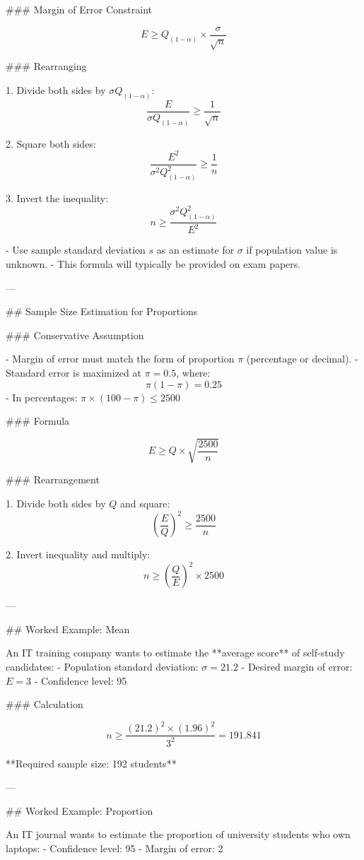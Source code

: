 ### Margin of Error Constraint

\[
E \geq Q_{(1-\alpha)} \times \frac{\sigma}{\sqrt{n}}
\]

### Rearranging

1. Divide both sides by \( \sigma Q_{(1-\alpha)} \):
\[
\frac{E}{\sigma Q_{(1-\alpha)}} \geq \frac{1}{\sqrt{n}}
\]

2. Square both sides:
\[
\frac{E^2}{\sigma^2 Q_{(1-\alpha)}^2} \geq \frac{1}{n}
\]

3. Invert the inequality:
\[
n \geq \frac{\sigma^2 Q_{(1-\alpha)}^2}{E^2}
\]

- Use sample standard deviation \( s \) as an estimate for \( \sigma \) if population value is unknown.
- This formula will typically be provided on exam papers.

---

## Sample Size Estimation for Proportions

### Conservative Assumption

- Margin of error must match the form of proportion \( \pi \) (percentage or decimal).
- Standard error is maximized at \( \pi = 0.5 \), where:
  \[
  \pi(1 - \pi) = 0.25
  \]
- In percentages: \( \pi \times (100 - \pi) \leq 2500 \)

### Formula

\[
E \geq Q \times \sqrt{ \frac{2500}{n} }
\]

### Rearrangement

1. Divide both sides by \( Q \) and square:
\[
\left( \frac{E}{Q} \right)^2 \geq \frac{2500}{n}
\]

2. Invert inequality and multiply:
\[
n \geq \left( \frac{Q}{E} \right)^2 \times 2500
\]

---

## Worked Example: Mean

An IT training company wants to estimate the **average score** of self-study candidates:
- Population standard deviation: \( \sigma = 21.2 \)
- Desired margin of error: \( E = 3 \)
- Confidence level: 95%

### Calculation

\[
n \geq \frac{(21.2)^2 \times (1.96)^2}{3^2} = 191.841
\]

**Required sample size: 192 students**

---

## Worked Example: Proportion

An IT journal wants to estimate the proportion of university students who own laptops:
- Confidence level: 95%
- Margin of error: 2%

